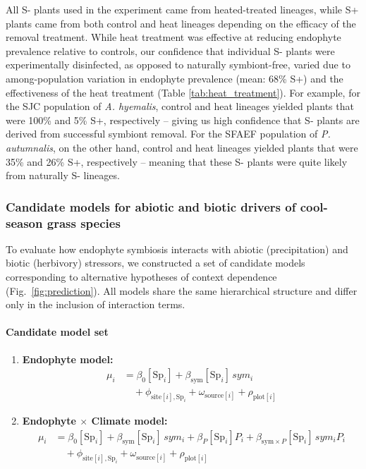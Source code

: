 \documentclass[12pt]{article}\usepackage[]{graphicx}\usepackage[dvipsnames]{xcolor}
\begin{document}
{All S- plants used in the experiment came from heated-treated lineages, while S+ plants came from both control and heat lineages depending on the efficacy of the removal treatment. 
While heat treatment was effective at reducing endophyte prevalence relative to controls, our confidence that individual S- plants were experimentally disinfected, as opposed to naturally symbiont-free, varied due to among-population variation in endophyte prevalence (mean: 68\% S+) and the effectiveness of the heat treatment (Table \ref{tab:heat_treatment}). 
For example, for the SJC population of \emph{A. hyemalis}, control and heat lineages yielded plants that were 100\% and 5\% S+, respectively -- giving us high confidence that S- plants are derived from successful symbiont removal. 
For the SFAEF population of \emph{P. autumnalis}, on the other hand, control and heat lineages yielded plants that were 35\% and 26\% S+, respectively -- meaning that these S- plants were quite likely from naturally S- lineages.

\subsubsection {Candidate models for abiotic and biotic drivers of cool-season grass species}
\label{sec:models}

To evaluate how endophyte symbiosis interacts with abiotic (precipitation) and biotic (herbivory) stressors, we constructed a set of candidate models corresponding to alternative hypotheses of context dependence (Fig.~\ref{fig:prediction}). All models share the same hierarchical structure and differ only in the inclusion of interaction terms.

\paragraph{Candidate model set}
\begin{enumerate}
    \item \textbf{Endophyte model:}
    \begin{align*}
    \mu_i &= \beta_0[\text{Sp}_i] + \beta_{\text{sym}}[\text{Sp}_i]\,sym_i \\
    &\quad + \phi_{\text{site}[i],\text{Sp}_i} + \omega_{\text{source}[i]} + \rho_{\text{plot}[i]}
    \end{align*}

    \item \textbf{Endophyte $\times$ Climate model:}
    \begin{align*}
    \mu_i &= \beta_0[\text{Sp}_i] + \beta_{\text{sym}}[\text{Sp}_i]\,sym_i
            + \beta_P[\text{Sp}_i] P_i
            + \beta_{\text{sym}\times P}[\text{Sp}_i]\,sym_i P_i \\
    &\quad + \phi_{\text{site}[i],\text{Sp}_i} + \omega_{\text{source}[i]} + \rho_{\text{plot}[i]}
    \end{align*}


\end{enumerate}}
\end{document}
